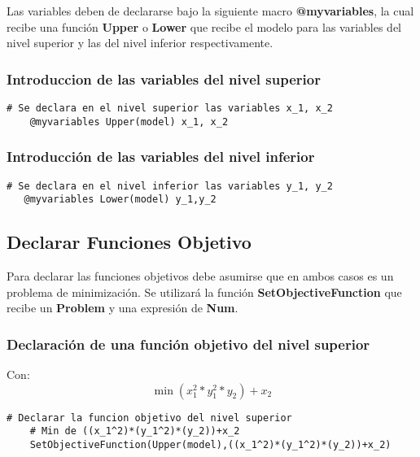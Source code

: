 Las variables deben de 
declararse bajo la siguiente macro \textbf{@myvariables}, la cual 
recibe una función \textbf{Upper} o \textbf{Lower} que recibe el modelo
para las variables del nivel superior y las del nivel inferior respectivamente.

\subsubsection{Introduccion de  las variables del nivel superior }

\begin{lstlisting}[caption={Introducir las variables del nivel superior}]
    # Se declara en el nivel superior las variables x_1, x_2
    @myvariables Upper(model) x_1, x_2
\end{lstlisting}

\subsubsection{Introducción de las variables del nivel inferior}

\begin{lstlisting}[caption={Introducir las variables del nivel inferior}]
   # Se declara en el nivel inferior las variables y_1, y_2
   @myvariables Lower(model) y_1,y_2
\end{lstlisting}


\subsection{Declarar Funciones Objetivo}

Para declarar las funciones objetivos debe asumirse que en ambos casos es un 
problema de minimización. Se utilizará la función \textbf{SetObjectiveFunction}
que recibe un \textbf{Problem} y una expresión de \textbf{Num}.

\subsubsection{ Declaración de una función objetivo del nivel superior}
Con: $$\min (x_1^2*y_1^2*y_2) + x_2$$
\begin{lstlisting}[caption={ Declarar una función objetivo del nivel superior}]
    # Declarar la funcion objetivo del nivel superior
    # Min de ((x_1^2)*(y_1^2)*(y_2))+x_2
    SetObjectiveFunction(Upper(model),((x_1^2)*(y_1^2)*(y_2))+x_2)
\end{lstlisting}

